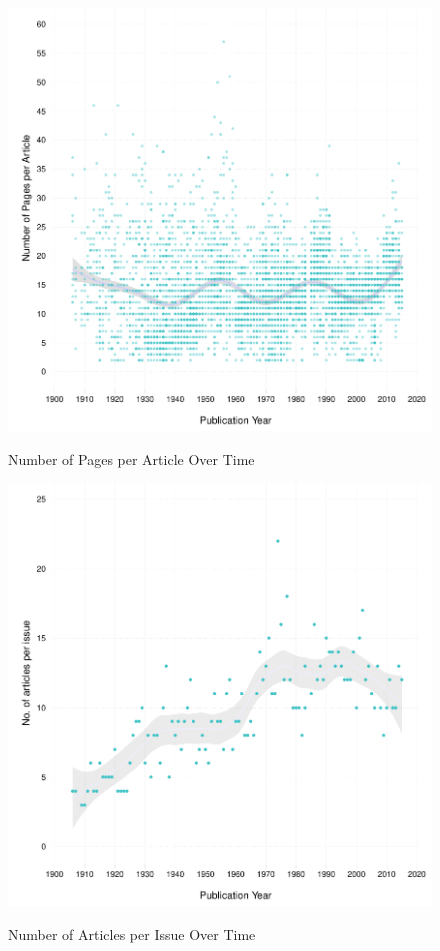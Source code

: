 \documentclass[11pt]{article}
\begin{document}
\begin{figure}[htbp]
\centering
\caption{Number of Pages per Article Over Time}
\includegraphics[scale=.85]{../figs/n_pages_per_article_over_time.pdf}
\label{fig:pages}
\end{figure}

\begin{figure}[htbp]
\centering
\caption{Number of Articles per Issue Over Time}
\includegraphics[scale=.85]{../figs/articles_per_issue_over_time.pdf}
\label{fig:narticles}
\end{figure}
\end{document}
